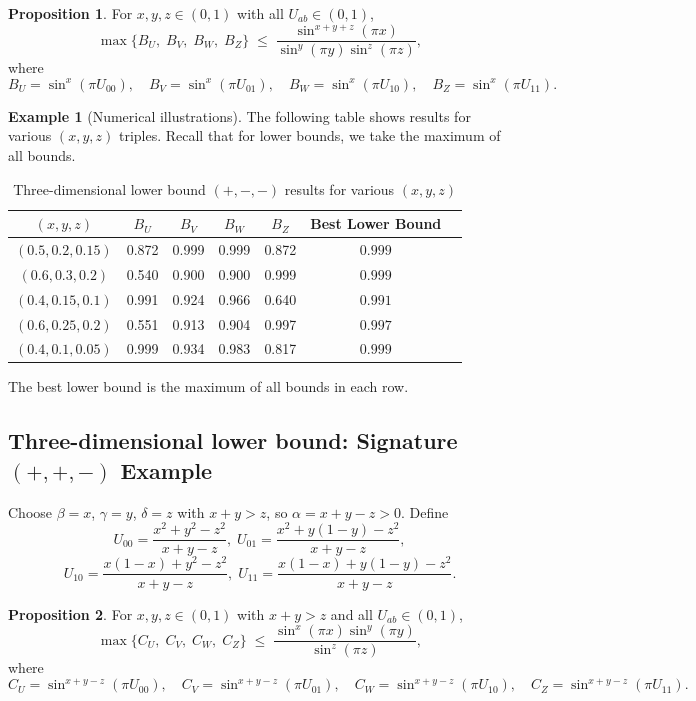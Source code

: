 \documentclass[12pt]{amsart}
\theoremstyle{definition}
\newtheorem{proposition}{Proposition}[section]
\newtheorem{example}{Example}[section]
\begin{document}
\begin{proposition}\label{prop:3d-lower-mminus-concrete}
For $x,y,z\in(0,1)$ with all $U_{ab}\in(0,1)$,
\[
\max\{B_U,\;B_V,\;B_W,\;B_Z\}
\;\leq\; \frac{\sin^{x+y+z}(\pi x)}{\sin^{y}(\pi y)\sin^{z}(\pi z)},
\]
where
\[
B_U = \sin^{x}(\pi U_{00}),\quad B_V = \sin^{x}(\pi U_{01}),\quad B_W = \sin^{x}(\pi U_{10}),\quad B_Z = \sin^{x}(\pi U_{11}).
\]
\end{proposition}

\begin{example}[Numerical illustrations]
The following table shows results for various $(x,y,z)$ triples. Recall that for lower bounds, we take the maximum of all bounds. 

\begin{table}[h]
\centering
\caption{Three-dimensional lower bound $(+,-,-)$ results for various $(x,y,z)$}
\label{tab:3d-lower-mminus-multi}
\begin{tabular}{|c|c|c|c|c|c|c|}
\hline
$(x,y,z)$ & $B_U$ & $B_V$ & $B_W$ & $B_Z$ & Best Lower Bound \\
\hline
$(0.5,0.2,0.15)$ & 0.872 & 0.999 & 0.999 & 0.872 & $0.999$ \\
$(0.6,0.3,0.2)$ & 0.540 & 0.900 & 0.900 & 0.999 &  $ 0.999$ \\
$(0.4,0.15,0.1)$ & 0.991 & 0.924 & 0.966 & 0.640 &  $ 0.991$ \\
$(0.6,0.25,0.2)$ & 0.551 & 0.913 & 0.904 & 0.997 &  $ 0.997$ \\
$(0.4,0.1,0.05)$ & 0.999 & 0.934 & 0.983 & 0.817 & $ 0.999$ \\
\hline
\end{tabular}
\end{table}
\noindent The best lower bound is the maximum of all bounds in each row.
\end{example}

\subsection{Three-dimensional lower bound: Signature $(+,+,-)$ Example}

Choose $\beta = x$, $\gamma = y$, $\delta = z$ with $x+y>z$, so $\alpha = x+y-z > 0$. Define
\[
U_{00} = \frac{x^2+y^2-z^2}{x+y-z},\;
U_{01} = \frac{x^2+y(1-y)-z^2}{x+y-z},
\]
\[
U_{10} = \frac{x(1-x)+y^2-z^2}{x+y-z},\;
U_{11} = \frac{x(1-x)+y(1-y)-z^2}{x+y-z}.
\]

\begin{proposition}\label{prop:3d-lower-ppminus-concrete}
For $x,y,z\in(0,1)$ with $x+y>z$ and all $U_{ab}\in(0,1)$,
\[
\max\{C_U,\;C_V,\;C_W,\;C_Z\}
\;\leq\; \frac{\sin^{x}(\pi x)\sin^{y}(\pi y)}{\sin^{z}(\pi z)},
\]
where
\[
C_U = \sin^{x+y-z}(\pi U_{00}),\quad C_V = \sin^{x+y-z}(\pi U_{01}),\quad C_W = \sin^{x+y-z}(\pi U_{10}),\quad C_Z = \sin^{x+y-z}(\pi U_{11}).
\]
\end{proposition}
\end{document}
